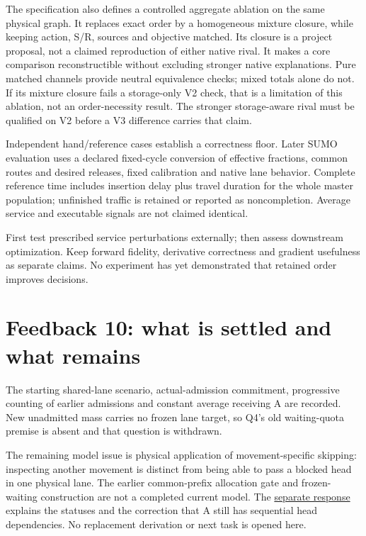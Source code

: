\documentclass[11pt,a4paper]{article}
\begin{document}
The specification also defines a controlled aggregate ablation on the same
physical graph. It replaces exact order by a homogeneous mixture closure,
while keeping action, S/R, sources and objective matched. Its closure is a
project proposal, not a claimed reproduction of either native rival.
It makes a core comparison reconstructible without excluding stronger
native explanations. Pure matched channels provide neutral equivalence
checks; mixed totals alone do not.
If its mixture closure fails a storage-only V2 check, that is a limitation
of this ablation, not an order-necessity result. The stronger storage-aware
rival must be qualified on V2 before a V3 difference carries that claim.

Independent hand/reference cases establish a correctness floor. Later
SUMO evaluation uses a declared fixed-cycle conversion of effective fractions,
common routes and desired releases, fixed calibration and native lane
behavior. Complete reference time includes insertion delay plus travel
duration for the whole master population; unfinished traffic is retained
or reported as noncompletion. Average service and executable signals are
not claimed identical.

First test prescribed service perturbations externally; then assess
downstream optimization. Keep forward fidelity, derivative correctness and
gradient usefulness as separate claims. No experiment has yet demonstrated
that retained order improves decisions.

\section{Feedback 10: what is settled and what remains}

The starting shared-lane scenario, actual-admission commitment, progressive
counting of earlier admissions and constant average receiving A are
recorded. New unadmitted mass carries no frozen lane target, so Q4's old
waiting-quota premise is absent and that question is withdrawn.

The remaining model issue is physical application of movement-specific
skipping: inspecting another movement is distinct from being able to pass
a blocked head in one physical lane. The earlier common-prefix allocation
gate and frozen-waiting construction are not a completed current model.
The \href{urban_feedback10_response.md}{separate response} explains the
statuses and the correction that A still has sequential head dependencies.
No replacement derivation or next task is opened here.
\end{document}
